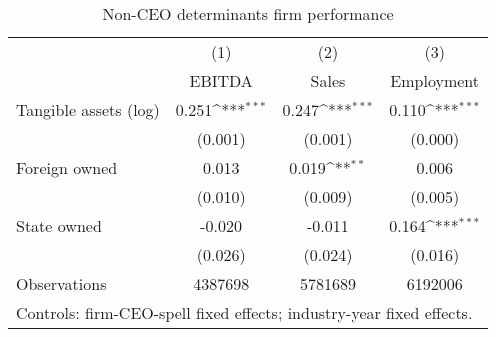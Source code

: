 \begin{table}[htbp]\centering
\def\sym#1{\ifmmode^{#1}\else\(^{#1}\)\fi}
\caption{Non-CEO determinants firm performance}
\begin{tabular}{l*{3}{c}}
\hline\hline
                    &\multicolumn{1}{c}{(1)}&\multicolumn{1}{c}{(2)}&\multicolumn{1}{c}{(3)}\\
                    &\multicolumn{1}{c}{EBITDA}&\multicolumn{1}{c}{Sales}&\multicolumn{1}{c}{Employment}\\
\hline
Tangible assets (log)&       0.251\sym{***}&       0.247\sym{***}&       0.110\sym{***}\\
                    &     (0.001)         &     (0.001)         &     (0.000)         \\
[1em]
Foreign owned       &       0.013         &       0.019\sym{**} &       0.006         \\
                    &     (0.010)         &     (0.009)         &     (0.005)         \\
[1em]
State owned         &      -0.020         &      -0.011         &       0.164\sym{***}\\
                    &     (0.026)         &     (0.024)         &     (0.016)         \\
\hline
Observations        &     4387698         &     5781689         &     6192006         \\
\hline\hline
\multicolumn{4}{l}{\footnotesize Controls: firm-CEO-spell fixed effects; industry-year fixed effects.}\\
\end{tabular}
\end{table}
